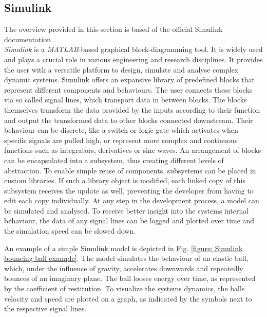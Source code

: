 \subsection{Simulink}
The overview provided in this section is based of the official Simulink documentation \parencite{matlabSimulinkDocumention}.\\
\textit{Simulink\textsuperscript{\textregistered}} is a \textit{MATLAB\textsuperscript{\textregistered}}-based graphical block-diagramming tool. 
It is widely used and plays a crucial role in various engineering and research disciplines.
It provides the user with a versatile platform to design, simulate and analyse complex dynamic systems.
Simulink offers an expansive library of predefined blocks that represent different components and behaviours.
The user connects these blocks via so called signal lines, which transport data in between blocks.
The blocks themselves transform the data provided by the inputs according to their function and output the transformed data to other blocks connected downstream.
Their behaviour can be discrete, like a switch or logic gate which activates when specific signals are pulled high, or represent more complex and continuous functions such as integrators, derivatives or sine waves.
An arrangement of blocks can be encapsulated into a subsystem, thus creating different levels of abstraction.
To enable simple reuse of components, subsystems can be placed in custom libraries.
If such a library object is modified, each linked copy of this subsystem receives the update as well, preventing the developer from having to edit each copy individually.
At any step in the development process, a model can be simulated and analysed.
To receive better insight into the systems internal behaviour, the data of any signal lines can be logged and plotted over time and the simulation speed can be slowed down.

An example of a simple Simulink model is depicted in Fig. \ref{figure: Simulink bouncing ball example}.
The model simulates the behaviour of an elastic ball, which, under the influence of gravity, accelerates downwards and repeatedly bounces of an imaginary plane.
The ball looses energy over time, as represented by the coefficient of restitution.
To visualize the systems dynamics, the balls velocity and speed are plotted on a graph, as indicated by the symbols next to the respective signal lines.

